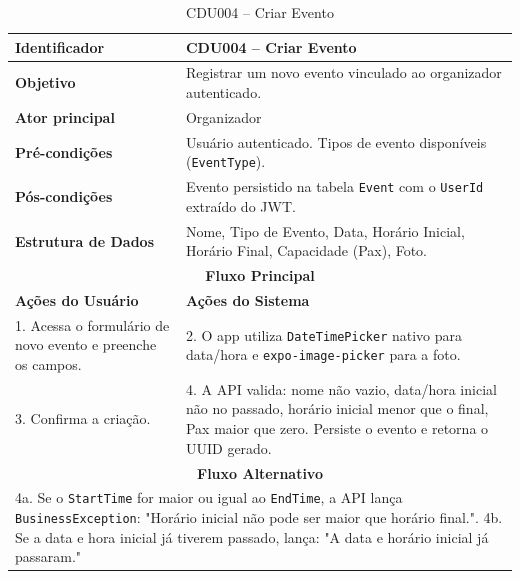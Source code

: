 \begin{table}[htbp]
\centering
\caption{CDU004 – Criar Evento}
\begin{tabular}{|p{4cm}|p{11cm}|}
\hline
\textbf{Identificador} & CDU004 – Criar Evento \\ \hline
\textbf{Objetivo} & Registrar um novo evento vinculado ao organizador autenticado. \\ \hline
\textbf{Ator principal} & Organizador \\ \hline
\textbf{Pré-condições} & Usuário autenticado. Tipos de evento disponíveis (\texttt{EventType}). \\ \hline
\textbf{Pós-condições} & Evento persistido na tabela \texttt{Event} com o \texttt{UserId} extraído do JWT. \\ \hline
\textbf{Estrutura de Dados} & Nome, Tipo de Evento, Data, Horário Inicial, Horário Final, Capacidade (Pax), Foto. \\ \hline
\multicolumn{2}{|c|}{\textbf{Fluxo Principal}} \\ \hline
\textbf{Ações do Usuário} & \textbf{Ações do Sistema} \\ \hline
1. Acessa o formulário de novo evento e preenche os campos. & 2. O app utiliza \texttt{DateTimePicker} nativo para data/hora e \texttt{expo-image-picker} para a foto. \\ \hline
3. Confirma a criação. & 4. A API valida: nome não vazio, data/hora inicial não no passado, horário inicial menor que o final, Pax maior que zero. Persiste o evento e retorna o UUID gerado. \\ \hline
\multicolumn{2}{|c|}{\textbf{Fluxo Alternativo}} \\ \hline
\multicolumn{2}{|p{15cm}|}{4a. Se o \texttt{StartTime} for maior ou igual ao \texttt{EndTime}, a API lança \texttt{BusinessException}: "Horário inicial não pode ser maior que horário final.". 4b. Se a data e hora inicial já tiverem passado, lança: "A data e horário inicial já passaram."} \\ \hline
\end{tabular}
\end{table}

